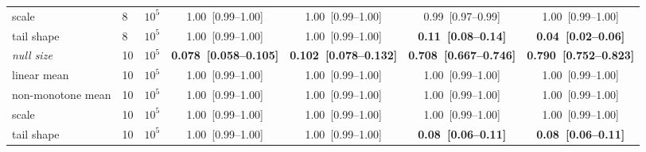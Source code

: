 \begin{table}[p]
{\begin{tabular}{llrcccc}
scale & 8 & $10^5$ & 1.00~[0.99--1.00] & 1.00~[0.99--1.00] & 0.99~[0.97--0.99] & 1.00~[0.99--1.00] \\
tail shape & 8 & $10^5$ & 1.00~[0.99--1.00] & 1.00~[0.99--1.00] & \textbf{0.11~[0.08--0.14]} & \textbf{0.04~[0.02--0.06]} \\
\midrule
\emph{null size} & 10 & $10^5$ & \textbf{0.078~[0.058--0.105]} & \textbf{0.102~[0.078--0.132]} & \textbf{0.708~[0.667--0.746]} & \textbf{0.790~[0.752--0.823]} \\
linear mean & 10 & $10^5$ & 1.00~[0.99--1.00] & 1.00~[0.99--1.00] & 1.00~[0.99--1.00] & 1.00~[0.99--1.00] \\
non-monotone mean & 10 & $10^5$ & 1.00~[0.99--1.00] & 1.00~[0.99--1.00] & 1.00~[0.99--1.00] & 1.00~[0.99--1.00] \\
scale & 10 & $10^5$ & 1.00~[0.99--1.00] & 1.00~[0.99--1.00] & 1.00~[0.99--1.00] & 1.00~[0.99--1.00] \\
tail shape & 10 & $10^5$ & 1.00~[0.99--1.00] & 1.00~[0.99--1.00] & \textbf{0.08~[0.06--0.11]} & \textbf{0.08~[0.06--0.11]} \\
\bottomrule
\end{tabular}}
\end{table}

